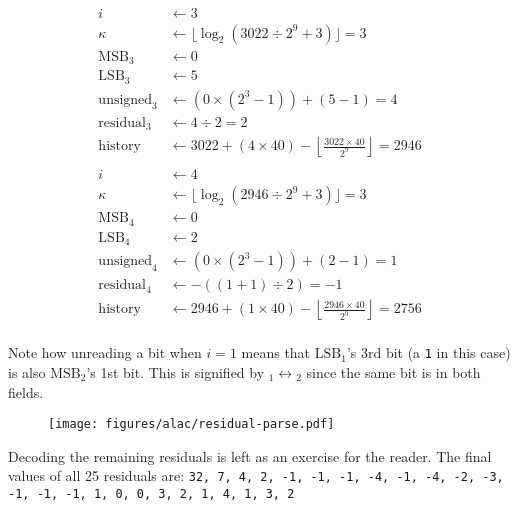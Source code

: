 {\begin{align*}
\end{align*}
\begin{align*}
i &\leftarrow 3 \\
\kappa &\leftarrow \lfloor\log_2(3022 \div 2 ^ 9 + 3)\rfloor = 3 \\
\text{MSB}_3 &\leftarrow 0 \\
\text{LSB}_3 &\leftarrow 5 \\
\text{unsigned}_3 &\leftarrow (0 \times (2 ^ 3 - 1)) + (5 - 1) = 4 \\
\text{residual}_3 &\leftarrow 4 \div 2 = 2 \\
\text{history} &\leftarrow 3022 + (4 \times 40) - \left\lfloor\frac{3022 \times 40}{2 ^ 9}\right\rfloor = 2946 \\
\end{align*}
\clearpage
\begin{align*}
i &\leftarrow 4 \\
\kappa &\leftarrow \lfloor\log_2(2946 \div 2 ^ 9 + 3)\rfloor = 3 \\
\text{MSB}_4 &\leftarrow 0 \\
\text{LSB}_4 &\leftarrow 2 \\
\text{unsigned}_4 &\leftarrow (0 \times (2 ^ 3 - 1)) + (2 - 1) = 1 \\
\text{residual}_4 &\leftarrow -((1 + 1) \div 2) = -1 \\
\text{history} &\leftarrow 2946 + (1 \times 40) - \left\lfloor\frac{2946 \times 40}{2 ^ 9}\right\rfloor = 2756 \\
\end{align*}
}
\par
\noindent
Note how unreading a bit when $i = 1$ means that $\text{LSB}_1$'s 3rd bit
(a \texttt{1} in this case) is also $\text{MSB}_2$'s 1st bit.
This is signified by $\text{}_1 \leftrightarrow \text{}_2$
since the same bit is in both fields.
\begin{figure}[h]
\texttt{[image: figures/alac/residual-parse.pdf]}
\end{figure}
\par
\noindent
Decoding the remaining residuals is left as an exercise for the reader.
The final values of all 25 residuals are:
\texttt{32, 7, 4, 2, -1, -1, -1, -4, -1, -4, -2, -3, -1, -1, -1,
1, 0, 0, 3, 2, 1, 4, 1, 3, 2}

\clearpage

